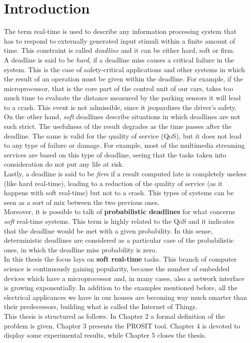 \chapter{Introduction}\label{chp:introduction}


The term real-time \cite{hardrealtime} is used to describe any information processing system that has to respond to externally generated input stimuli within a finite amount of time. This constraint is called \emph{deadline} and it can be either hard, soft or firm.\\
A deadline is said to be \emph{hard}, if a deadline miss causes a critical failure in the system. This is the case of safety-critical applications and other systems in which the result of an operation must be given within the deadline. For example, if the microprocessor, that is the core part of the control unit of our cars, takes too much time to evaluate the distance measured by the parking sensors it will lead to a crash. This event is not admissible, since it jeopardizes the driver's safety.\\
On the other hand, \emph{soft} deadlines describe situations in which deadlines are not such strict. The usefulness of the result degrades as the time passes after the deadline. The same is valid for the quality of service (QoS), but it does not lead to any type of failure or damage. For example, most of the multimedia streaming services are based on this type of deadline, seeing that the tasks taken into consideration do not put any life at risk.\\
Lastly, a deadline is said to be \emph{firm} if a result computed late is completely useless (like hard real-time), leading to a reduction of the quality of service (as it happens with soft real-time) but not to a crash. This types of systems can be seen as a sort of mix between the two previous ones.\\
Moreover, it is possible to talk of \textbf{probabilistic deadlines} \cite{abeni} for what concerns \emph{soft} real-time systems. This term is highly related to the QoS and it indicates that the deadline would be met with a given probability. In this sense, deterministic deadlines are considered as a particular case of the probabilistic ones, in which the deadline miss probability is zero.\\ 
In this thesis the focus lays on \textbf{soft real-time} tasks. This branch of computer science is continuously gaining popularity, because the number of embedded devices which have a microprocessor and, in many cases, also a network interface is growing exponentially. In addition to the examples mentioned before, all the electrical applicances we have in our houses are becoming way much smarter than their predecessors, building what is called the Internet of Things.\\
This thesis is structured as follows. In Chapter 2 a formal definition of the problem is given. Chapter 3 presents the PROSIT tool. Chapter 4 is devoted to display some experimental results, while Chapter 5 closes the thesis.      